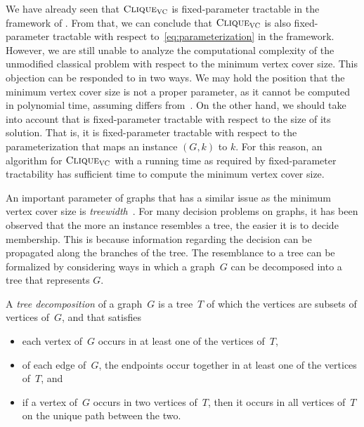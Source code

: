 We have already seen that $\textnormal{\textsc{Clique}}_{\textnormal{\textsc{VC}}}$ is fixed-parameter tractable in the framework of \citeauthor{downey1999parameterized}.
From that, we can conclude that $\textnormal{\textsc{Clique}}_{\textnormal{\textsc{VC}}}$ is also fixed-parameter tractable with respect to~\eqref{eq:parameterization} in the \citeauthor{flum2006parameterized} framework.
However, we are still unable to analyze the computational complexity of the unmodified classical  problem with respect to the minimum vertex cover size.
This objection can be responded to in two ways.
\label{p:computing_parameters}%
We may hold the position that the minimum vertex cover size is not a proper parameter, as it cannot be computed in polynomial time, assuming  differs from~.
On the other hand, we should take into account that  is fixed-parameter tractable with respect to the size of its solution.
That is, it is fixed-parameter tractable with respect to the parameterization that maps an instance $(G, k)$ to $k$.
For this reason, an algorithm for $\textnormal{\textsc{Clique}}_{\textnormal{\textsc{VC}}}$ with a running time as required by fixed-parameter tractability has sufficient time to compute the minimum vertex cover size.

An important parameter of graphs that has a similar issue as the minimum vertex cover size is \emph{treewidth}~\parencite{robertson1986graph,bodlaender1998partial,diestel2017graph}.
For many decision problems on graphs, it has been observed that the more an instance resembles a tree, the easier it is to decide membership.
This is because information regarding the decision can be propagated along the branches of the tree.
The resemblance to a tree can be formalized by considering ways in which a graph~$G$ can be decomposed into a tree that represents $G$.
\begin{definition}
  A \emph{tree decomposition} of a graph~$G$ is a tree~$T$ of which the vertices are subsets of vertices of~$G$, and that satisfies
  \begin{itemize}
  \item
    each vertex of~$G$ occurs in at least one of the vertices of~$T$,
  \item
    of each edge of~$G$, the endpoints occur together in at least one of the vertices of~$T$, and
  \item
    if a vertex of~$G$ occurs in two vertices of~$T$, then it occurs in all vertices of~$T$ on the unique path between the two.
  \end{itemize}
\end{definition}

